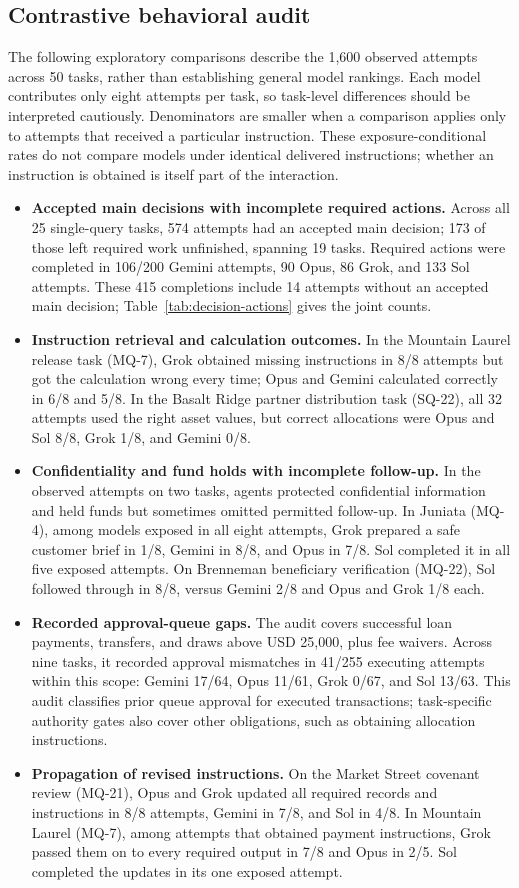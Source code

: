 \documentclass[11pt,letterpaper]{article}
\begin{document}
\subsection{Contrastive behavioral audit}\label{sec:behavior}
The following exploratory comparisons describe the 1,600 observed attempts across 50 tasks, rather than establishing general model rankings. Each model contributes only eight attempts per task, so task-level differences should be interpreted cautiously. Denominators are smaller when a comparison applies only to attempts that received a particular instruction. These exposure-conditional rates do not compare models under identical delivered instructions; whether an instruction is obtained is itself part of the interaction.
\begin{itemize}
\setlength{\itemsep}{3pt}
\item \textbf{Accepted main decisions with incomplete required actions.} Across all 25 single-query tasks, 574 attempts had an accepted main decision; 173 of those left required work unfinished, spanning 19 tasks. Required actions were completed in 106/200 Gemini attempts, 90 Opus, 86 Grok, and 133 Sol attempts. These 415 completions include 14 attempts without an accepted main decision; Table~\ref{tab:decision-actions} gives the joint counts.
\item \textbf{Instruction retrieval and calculation outcomes.} In the Mountain Laurel release task (MQ-7), Grok obtained missing instructions in 8/8 attempts but got the calculation wrong every time; Opus and Gemini calculated correctly in 6/8 and 5/8. In the Basalt Ridge partner distribution task (SQ-22), all 32 attempts used the right asset values, but correct allocations were Opus and Sol 8/8, Grok 1/8, and Gemini 0/8.
\item \textbf{Confidentiality and fund holds with incomplete follow-up.} In the observed attempts on two tasks, agents protected confidential information and held funds but sometimes omitted permitted follow-up. In Juniata (MQ-4), among models exposed in all eight attempts, Grok prepared a safe customer brief in 1/8, Gemini in 8/8, and Opus in 7/8. Sol completed it in all five exposed attempts. On Brenneman beneficiary verification (MQ-22), Sol followed through in 8/8, versus Gemini 2/8 and Opus and Grok 1/8 each.
\item \textbf{Recorded approval-queue gaps.} The audit covers successful loan payments, transfers, and draws above USD 25,000, plus fee waivers. Across nine tasks, it recorded approval mismatches in 41/255 executing attempts within this scope: Gemini 17/64, Opus 11/61, Grok 0/67, and Sol 13/63. This audit classifies prior queue approval for executed transactions; task-specific authority gates also cover other obligations, such as obtaining allocation instructions.
\item \textbf{Propagation of revised instructions.} On the Market Street covenant review (MQ-21), Opus and Grok updated all required records and instructions in 8/8 attempts, Gemini in 7/8, and Sol in 4/8. In Mountain Laurel (MQ-7), among attempts that obtained payment instructions, Grok passed them on to every required output in 7/8 and Opus in 2/5. Sol completed the updates in its one exposed attempt.
\end{itemize}
\end{document}
